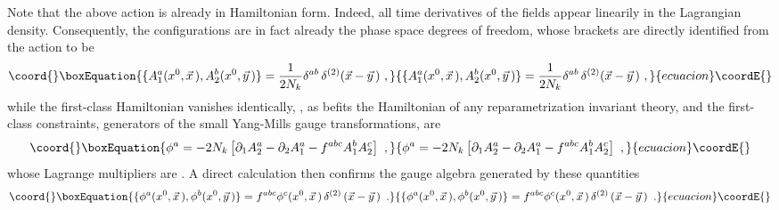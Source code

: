 \documentclass[a4paper,11pt]{article}
\begin{document}
Note that the above action is already in Hamiltonian form. Indeed, all
time derivatives of the fields appear linearily in the Lagrangian density.
Consequently, the configurations \coordHE{} are in fact already the
phase space degrees of freedom, whose brackets are directly identified
from the action to be
\begin{equation}\coord{}\boxEquation{
\{A^a_1(x^0,\vec{x}\,),A^b_2(x^0,\vec{y}\,)\}=
\frac{1}{2N_k}\delta^{ab}\,\delta^{(2)}(\vec{x}-\vec{y}\,)\ ,
}{
\{A^a_1(x^0,\vec{x}\,),A^b_2(x^0,\vec{y}\,)\}=
\frac{1}{2N_k}\delta^{ab}\,\delta^{(2)}(\vec{x}-\vec{y}\,)\ ,
}{ecuacion}\coordE{}\end{equation}
while the first-class Hamiltonian vanishes identically, \coordHE{}, as
befits the Hamiltonian of any reparametrization invariant theory,
and the first-class constraints, generators of the small Yang-Mills
gauge transformations, are
\begin{equation}\coord{}\boxEquation{
\phi^a=-2N_k\left[\partial_1A^a_2-\partial_2A^a_1-f^{abc}A^b_1A^c_2\right]\ ,
}{
\phi^a=-2N_k\left[\partial_1A^a_2-\partial_2A^a_1-f^{abc}A^b_1A^c_2\right]\ ,
}{ecuacion}\coordE{}\end{equation}
whose Lagrange multipliers are \coordHE{}. A direct calculation then confirms
the gauge algebra generated by these quantities
\begin{equation}\coord{}\boxEquation{
\{\phi^a(x^0,\vec{x}\,),\phi^b(x^0,\vec{y}\,)\}=f^{abc}\phi^c(x^0,\vec{x}\,)\,
\delta^{(2)}\left(\vec{x}-\vec{y}\,\right)\ .
}{
\{\phi^a(x^0,\vec{x}\,),\phi^b(x^0,\vec{y}\,)\}=f^{abc}\phi^c(x^0,\vec{x}\,)\,
\delta^{(2)}\left(\vec{x}-\vec{y}\,\right)\ .
}{ecuacion}\coordE{}\end{equation}
\end{document}

